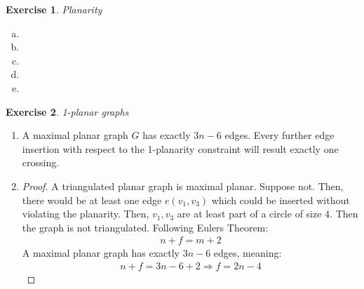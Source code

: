 \documentclass[a4paper,12pt,headsepline]{scrartcl}
\newtheorem{aufgabe}{Exercise}
\begin{document}
\newpage
\begin{aufgabe}Planarity
\end{aufgabe}
\begin{enumerate}[b)]
	\item
	\item 
	\item 
	\item
	\item
\end{enumerate}
\newpage
\begin{aufgabe}1-planar graphs
\end{aufgabe}
\begin{enumerate}
	\item A maximal planar graph $G$ has exactly $3n-6$ edges. Every further edge insertion with respect to the 1-planarity constraint will result exactly one crossing. 
	\item 
	\begin{proof}
		A triangulated planar graph is maximal planar. Suppose not. Then, there would be at least one edge $e (v_1,v_3)$ which could be inserted without violating the planarity. Then, $v_1,v_3$ are at least part of a circle of size $4$. Then the graph is not triangulated. Following Eulers Theorem:
		\begin{align*}
		n + f = m + 2
		\end{align*}
		A maximal planar graph has exactly $3n-6$ edges, meaning:
		\begin{align*}
		n + f = 3n-6 + 2   \Rightarrow f = 2n-4
		\end{align*}
	\end{proof}
\end{enumerate}
\end{document}
